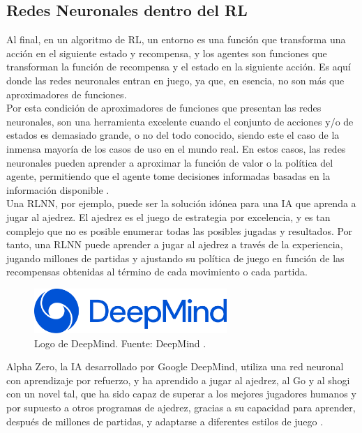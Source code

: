 \subsection{Redes Neuronales dentro del RL}
Al final, en un algoritmo de RL, un entorno es una función que transforma una acción en el 
siguiente estado y recompensa, y los agentes son funciones que transforman la función de 
recompensa y el estado en la siguiente acción. Es aquí donde las redes neuronales entran en juego, 
ya que, en esencia, no son más que aproximadores de funciones.\\

Por esta condición de aproximadores de funciones que presentan las redes neuronales, son una 
herramienta excelente cuando el conjunto de acciones y/o de estados es demasiado grande, o no del
todo conocido, siendo este el caso de la inmensa mayoría de los casos de uso en el mundo real.
En estos casos, las redes neuronales pueden aprender a aproximar la función de valor o la política
del agente, permitiendo que el agente tome decisiones informadas basadas en la información
disponible \cite{wang2022nn_drl}.\\

Una RLNN, por ejemplo, puede ser la solución idónea para una IA que aprenda a jugar al ajedrez. El
ajedrez es el juego de estrategia por excelencia, y es tan complejo que no es posible enumerar 
todas las posibles jugadas y resultados. Por tanto, una RLNN puede aprender a jugar al ajedrez a 
través de la experiencia, jugando millones de partidas y ajustando su política de juego en función 
de las recompensas obtenidas al término de cada movimiento o cada partida.

\begin{figure}[ht]
    \centering
    \includegraphics[width=0.65\textwidth]{images/DeepMind_new_logo.svg.png}
    \caption{Logo de DeepMind. Fuente: DeepMind \cite{deepmind2025website}.}
    \label{fig:deepmind_logo}
\end{figure}

Alpha Zero, la IA desarrollado por Google DeepMind, utiliza una red neuronal con aprendizaje por 
refuerzo, y ha aprendido a jugar al ajedrez, al Go y al shogi con un novel tal, que ha sido capaz
de superar a los mejores jugadores humanos y por supuesto a otros programas de ajedrez, gracias a 
su capacidad para aprender, después de millones de partidas, y adaptarse a diferentes estilos de 
juego \cite{deepmind2017alphazero}.

